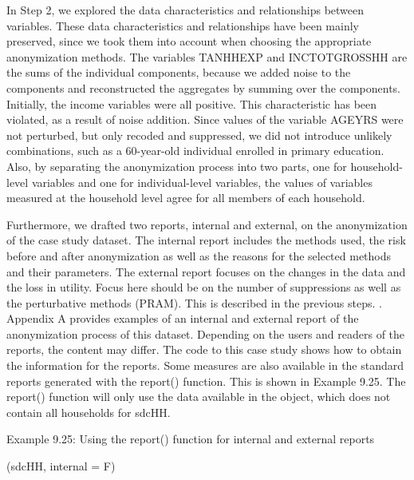 \documentclass[letterpaper,10pt,english]{sphinxmanual}
\begin{document}
In Step 2, we explored the data characteristics and relationships
between variables. These data characteristics and relationships have
been mainly preserved, since we took them into account when choosing the
appropriate anonymization methods. The variables TANHHEXP and
INCTOTGROSSHH are the sums of the individual components, because we
added noise to the components and reconstructed the aggregates by
summing over the components. Initially, the income variables were all
positive. This characteristic has been violated, as a result of noise
addition. Since values of the variable AGEYRS were not perturbed, but
only recoded and suppressed, we did not introduce unlikely combinations,
such as a 60-year-old individual enrolled in primary education. Also, by
separating the anonymization process into two parts, one for
household-level variables and one for individual-level variables, the
values of variables measured at the household level agree for all
members of each household.

Furthermore, we drafted two reports, internal and external, on the
anonymization of the case study dataset. The internal report includes
the methods used, the risk before and after anonymization as well as the
reasons for the selected methods and their parameters. The external
report focuses on the changes in the data and the loss in utility. Focus
here should be on the number of suppressions as well as the perturbative
methods (PRAM). This is described in the previous steps. .
Appendix A provides examples of an internal and external report of the
anonymization process of this dataset. Depending on the users and
readers of the reports, the content may differ. The code to this case
study shows how to obtain the information for the reports. Some measures
are also available in the standard reports generated with the report()
function. This is shown in Example 9.25. The report() function will only
use the data available in the  object, which does not contain
all households for sdcHH.

Example 9.25: Using the report() function for internal and external
reports

\begin{DUlineblock}{0em}
\item[] 
\item[] (sdcHH, internal = F) 
\end{DUlineblock}
\end{document}
